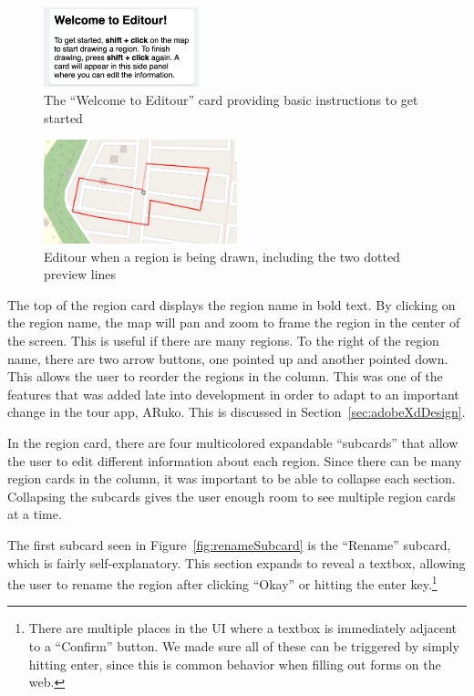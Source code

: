 \documentclass[a4paper, 10pt, american, titlepage]{article}
\begin{document}
\begin{figure}[h]
	\centering
	\includegraphics[width=0.4\textwidth]{welcome-card-editour.png}
    \caption{The ``Welcome to Editour'' card providing basic instructions to
    get started}
	\label{fig:welcomeCard}
\end{figure}

\begin{figure}[h]
	\centering
	\includegraphics[width=0.5\textwidth]{drawing-region-editour.png}
	\caption{Editour when a region is being drawn, including the two dotted
		preview lines}
	\label{fig:drawingRegion}
\end{figure}

The top of the region card displays the region name in bold text. By clicking
on the region name, the map will pan and zoom to frame the region in the center
of the screen. This is useful if there are many regions. To the right of the
region name, there are two arrow buttons, one pointed up and another pointed
down. This allows the user to reorder the regions in the column. This was one
of the features that was added late into development in order to adapt to an
important change in the tour app, ARuko. This is discussed in
Section~\ref{sec:adobeXdDesign}.

In the region card, there are four multicolored expandable ``subcards'' that
allow the user to edit different information about each region. Since there can
be many region cards in the column, it was important to be able to collapse
each section. Collapsing the subcards gives the user enough room to see
multiple region cards at a time.

The first subcard seen in Figure~\ref{fig:renameSubcard} is the ``Rename''
subcard, which is fairly self-explanatory.  This section expands to reveal a
textbox, allowing the user to rename the region after clicking ``Okay'' or
hitting the enter key.\footnote{There are multiple places in the UI where a
textbox is immediately adjacent to a ``Confirm'' button.  We made sure all of
these can be triggered by simply hitting enter, since this is common behavior
when filling out forms on the web.}
\end{document}
